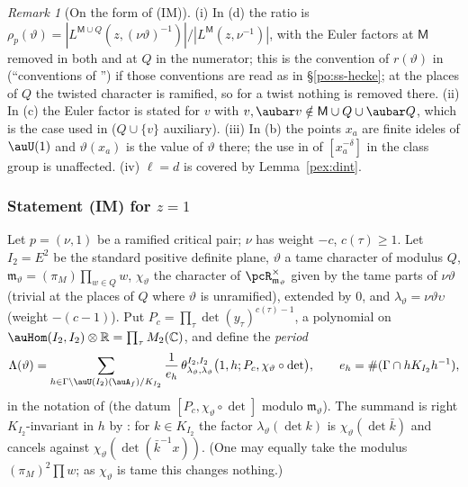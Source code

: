 \documentclass[10pt]{amsart}
\theoremstyle{definition}
\theoremstyle{remark}
\newtheorem{remark}[theorem]{Remark}
\newcommand{\C}{\mathbb C}
\newcommand{\R}{\mathbb R}
\begin{document}
\begin{remark}[On the form of (IM)]\label{pex:rem-IM}
(i) In (d) the ratio is $\rho_p(\vartheta)=|L^{\mathsf M\cup Q}(z,(\nu\vartheta)^{-1})|/|L^{\mathsf M}(z,
\nu^{-1})|$, with the Euler factors at $\mathsf M$ removed in both and at $Q$ in the numerator; this is
the convention of $r(\vartheta)$ in {\cite[\S3.5]{P55}} (``conventions of
{\cite[Theorem~2.2(b)]{P55}}'') if those conventions are read as in \S\ref{po:ss-hecke}; at the places of $Q$
the twisted character is ramified, so for a twist nothing is removed there. (ii) In (c) the Euler
factor is stated for $v$ with $v,\aubar v\notin\mathsf M\cup Q\cup\aubar Q$, which is the case used in
{\cite[(6)]{P55}} ($Q\cup\{v\}$ auxiliary). (iii) In (b) the points $x_a$ are finite ideles of
$\auU(1)$ and $\vartheta(x_a)$ is the value of $\vartheta$ there; the use in {\cite[\S3.5]{P55}} of
$[x_a^{-\delta}]$ in the class group is unaffected. (iv) $\ell=d$ is covered by Lemma~\ref{pex:dint}.
\end{remark}

\subsubsection{Statement {\rm(IM)} for $z=1$}\label{pex:ss-IM1}

Let $p=(\nu,1)$ be a ramified critical pair; $\nu$ has weight $-c$, $c(\tau)\ge1$. Let $I_2=E^2$ be the
standard positive definite plane, $\vartheta$ a tame character of modulus $Q$, $\mathfrak m_\vartheta=
(\pi_M)\prod_{w\in Q}w$, $\chi_\vartheta$ the character of $\pcR_{\mathfrak m_\vartheta}^\times$ given by the
tame parts of $\nu\vartheta$ (trivial at the places of $Q$ where $\vartheta$ is unramified), extended by
$0$, and $\lambda_\vartheta=\nu\vartheta\upsilon$ (weight $-(c-1)$). Put
$P_c=\prod_\tau\det(y_\tau)^{c(\tau)-1}$, a polynomial on $\auHom(I_2,I_2)\otimes\R=\prod_\tau M_2(\C)$,
and define the \emph{period}
\[
\Lambda(\vartheta)=\sum_{h\in\Gamma\backslash\auU(I_2)(\auA_f)/K_{I_2}}\frac1{e_h}\,\theta^{I_2,I_2}_{
\lambda_\vartheta,\lambda_\vartheta}\bigl(1,h;P_c,\chi_\vartheta\circ\det\bigr),\qquad e_h=\#(\Gamma\cap
hK_{I_2}h^{-1}),
\]
in the notation of {\cite[\S2.3]{P53}} (the datum $[P_c,\chi_\vartheta\circ\det]$ modulo
$\mathfrak m_\vartheta$). The summand is right $K_{I_2}$-invariant in $h$ by {\cite[Lemma~2.9]{P53}}: for
$k\in K_{I_2}$ the factor $\lambda_\vartheta(\det k)$ is $\chi_\vartheta(\det\bar k)$ and cancels against
$\chi_\vartheta(\det(\bar k^{-1}x))$. (One may equally take the modulus $(\pi_M)^2\prod w$; as
$\chi_\vartheta$ is tame this changes nothing.)
\end{document}
